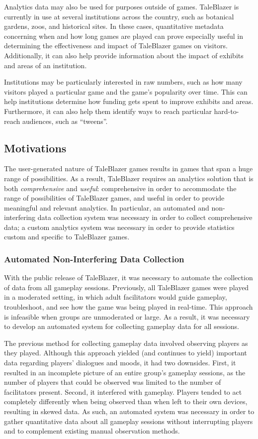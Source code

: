 Analytics data may also be used for purposes outside of games. TaleBlazer is currently in use at several institutions across the country, such as botanical gardens, zoos, and historical sites. In these cases, quantitative metadata concerning when and how long games are played can prove especially useful in determining the effectiveness and impact of TaleBlazer games on visitors. Additionally, it can also help provide information about the impact of exhibits and areas of an institution. 

Institutions may be particularly interested in raw numbers, such as how many visitors played a particular game and the game's popularity over time. This can help institutions determine how funding gets spent to improve exhibits and areas. Furthermore, it can also help them identify ways to reach particular hard-to-reach audiences, such as ``tweens''.

\subsection{Motivations}
The user-generated nature of TaleBlazer games results in games that span a huge range of possibilities. As a result, TaleBlazer requires an analytics solution that is both \textit{comprehensive} and \textit{useful}: comprehensive in order to accommodate the range of possibilities of TaleBlazer games, and useful in order to provide meaningful and relevant analytics. In particular, an automated and non-interfering data collection system was necessary in order to collect comprehensive data; a custom analytics system was necessary in order to provide statistics custom and specific to TaleBlazer games.

\subsubsection{Automated Non-Interfering Data Collection}

With the public release of TaleBlazer, it was necessary to automate the collection of data from all gameplay sessions. Previously, all TaleBlazer games were played in a moderated setting, in which adult facilitators would guide gameplay, troubleshoot, and see how the game was being played in real-time. This approach is infeasible when groups are unmoderated or large. As a result, it was necessary to develop an automated system for collecting gameplay data for all sessions.

The previous method for collecting gameplay data involved observing players as they played. Although this approach yielded (and continues to yield) important data regarding players' dialogues and moods, it had two downsides. First, it resulted in an incomplete picture of an entire group's gameplay sessions, as the number of players that could be observed was limited to the number of facilitators present. Second, it interfered with gameplay. Players tended to act completely differently when being observed than when left to their own devices, resulting in skewed data. As such, an automated system was necessary in order to gather quantitative data about all gameplay sessions without interrupting players and to complement existing manual observation methods.


